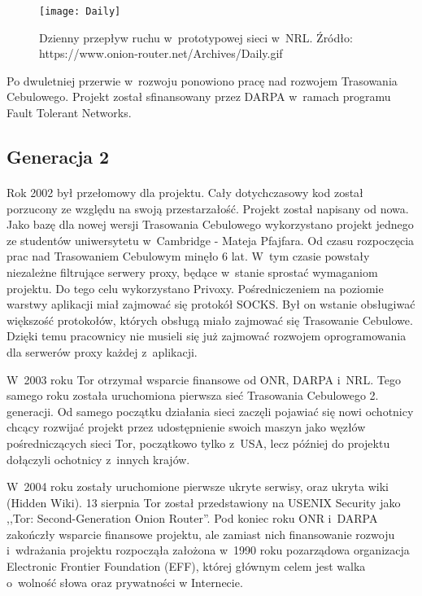 \begin{figure}
  \centering
  \texttt{[image: Daily]}
  \caption[Caption for LOF]{Dzienny przepływ ruchu w~prototypowej sieci w~NRL.\newline
  Źródło: https://www.onion-router.net/Archives/Daily.gif}
  \label{rys:dzienny}
\end{figure}

Po dwuletniej przerwie w~rozwoju ponowiono pracę nad rozwojem Trasowania Cebulowego. Projekt został sfinansowany przez DARPA w~ramach programu Fault Tolerant Networks.

\subsection{Generacja 2}\paragraph{}
Rok 2002 był przełomowy dla projektu. Cały dotychczasowy kod został porzucony ze względu na swoją przestarzałość. Projekt został napisany od nowa. Jako bazę dla nowej wersji Trasowania Cebulowego wykorzystano projekt jednego ze studentów uniwersytetu w~Cambridge - Mateja Pfajfara. Od czasu rozpoczęcia prac nad Trasowaniem Cebulowym minęło 6 lat. W~tym czasie powstały niezależne filtrujące serwery proxy, będące w~stanie sprostać wymaganiom projektu. Do tego celu wykorzystano Privoxy. Pośredniczeniem na poziomie warstwy aplikacji miał zajmować się protokół SOCKS. Był on wstanie obsługiwać większość protokołów, których obsługą miało zajmować się Trasowanie Cebulowe. Dzięki temu pracownicy nie musieli się już zajmować rozwojem oprogramowania dla serwerów proxy każdej z~aplikacji. 

W~2003 roku Tor otrzymał wsparcie finansowe od ONR, DARPA i~NRL. Tego samego roku została uruchomiona pierwsza sieć Trasowania Cebulowego 2. generacji. Od samego początku działania sieci zaczęli pojawiać się nowi ochotnicy chcący rozwijać projekt przez udostępnienie swoich maszyn jako węzłów pośredniczących sieci Tor, początkowo tylko z~USA, lecz później do projektu dołączyli ochotnicy z~innych krajów. 

W~2004 roku zostały uruchomione pierwsze ukryte serwisy, oraz ukryta wiki (Hidden Wiki). 13 sierpnia Tor został przedstawiony na USENIX Security jako ,,Tor: Second-Generation Onion Router''. Pod koniec roku ONR i~DARPA zakończły wsparcie finansowe projektu, ale zamiast nich finansowanie rozwoju i~wdrażania projektu rozpocząła założona w~1990 roku pozarządowa organizacja Electronic Frontier Foundation (EFF), której głównym celem jest walka o~wolność słowa oraz prywatności w Internecie\cite{about_eff, onion_router_history}.

